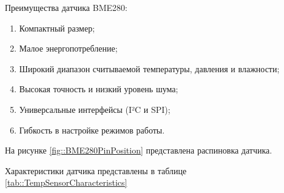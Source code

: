 Преимущества датчика BME280:

\begin{enumerate}

    \item Компактный размер;
	
    \item Малое энергопотребление;
	
    \item Широкий диапазон считываемой температуры, давления и влажности;
    
    \item Высокая точность и низкий уровень шума;
 
    \item Универсальные интерфейсы (I²C и SPI);
    
    \item Гибкость в настройке режимов работы.
    
\end{enumerate}

На рисунке \ref{fig::BME280PinPosition} представлена распиновка датчика.


Характеристики датчика представлены в таблице \ref{tab::TempSensorCharacteristics}



%
%
